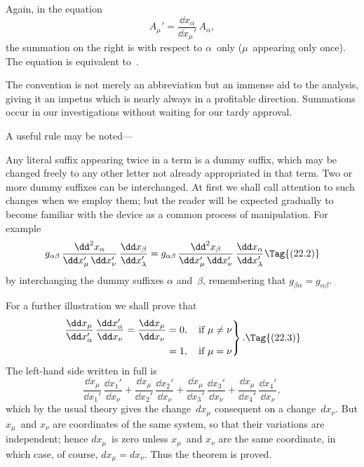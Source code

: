 \documentclass[12pt]{book}
\begin{document}
Again, in the equation
\[
A_{\mu}' = \frac{\dd x_{\alpha}}{\dd x_{\mu}'}\, A_{\alpha},
\]
the summation on the right is with respect to $\alpha$~only ($\mu$~appearing only once).
The equation is equivalent to~.

The convention is not merely an abbreviation but an immense aid to the
analysis, giving it an impetus which is nearly always in a profitable direction.
Summations occur in our investigations without waiting for our tardy approval.

A useful rule may be noted---

Any literal suffix appearing twice in a term is a dummy suffix, which may
be changed freely to any other letter not already appropriated in that term.
Two or more dummy suffixes can be interchanged\footnotemark.\footnotetext
  {At first we shall call attention to such changes when we employ them; but the reader will
  be expected gradually to become familiar with the device as a common process of manipulation.}
For example
%
\[
g_{\alpha\beta}\, \frac{\dd^{2} x_{\alpha}}{\dd x_{\mu}'\, \dd x_{\nu}'}\, \frac{\dd x_{\beta}}{\dd x_{\lambda}'}
= g_{\alpha\beta}\, \frac{\dd^{2} x_{\beta}}{\dd x_{\mu}'\, \dd x_{\nu}'}\, \frac{\dd x_{\alpha}}{\dd x_{\lambda}'}
\Tag{(22.2)}
\]
{\Loosen by interchanging the dummy suffixes $\alpha$ and~$\beta$, remembering that $g_{\beta\alpha} = g_{\alpha\beta}$.}

For a further illustration we shall prove that
\[
\left.
\begin{aligned}
  \frac{\dd x_{\mu}}{\dd x_{\alpha}'}\, \frac{\dd x_{\alpha}'}{\dd x_{\nu}}
  = \frac{\dd x_{\mu}}{\dd x_{\nu}}
  &= 0,\quad \text{if $\mu \neq \nu$} \\
  &= 1,\quad \text{if $\mu = \nu$}
\end{aligned}
\right\}.
\Tag{(22.3)}
\]
The left-hand side written in full is
\[
\frac{\dd x_{\mu}}{\dd x_{1}'}\, \frac{\dd x_{1}'}{\dd x_{\nu}}
+ \frac{\dd x_{\mu}}{\dd x_{2}'}\, \frac{\dd x_{2}'}{\dd x_{\nu}}
+ \frac{\dd x_{\mu}}{\dd x_{3}'}\, \frac{\dd x_{3}'}{\dd x_{\nu}}
+ \frac{\dd x_{\mu}}{\dd x_{4}'}\, \frac{\dd x_{4}'}{\dd x_{\nu}},
\]
which by the usual theory gives the change~$dx_{\mu}$ consequent on a change~$dx_{\nu}$.
But $x_{\mu}$~and $x_{\nu}$ are coordinates of the same system, so that their variations are
independent; hence $dx_{\mu}$~is zero unless $x_{\mu}$~and $x_{\nu}$ are the same coordinate, in
which case, of course, $dx_{\mu} = dx_{\nu}$. Thus the theorem is proved.
\end{document}
